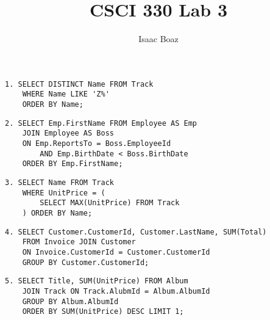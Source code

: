 \documentclass{article}
\title{CSCI 330 Lab 3}
\author{Isaac Boaz}
\begin{document}
\maketitle

\lstset{
    language=SQL,
    basicstyle=\small,
    showstringspaces=false
}

\begin{lstlisting}
1. SELECT DISTINCT Name FROM Track
    WHERE Name LIKE 'Z%'
    ORDER BY Name;\end{lstlisting}

\begin{lstlisting}
2. SELECT Emp.FirstName FROM Employee AS Emp
    JOIN Employee AS Boss
    ON Emp.ReportsTo = Boss.EmployeeId
        AND Emp.BirthDate < Boss.BirthDate
    ORDER BY Emp.FirstName;
\end{lstlisting}

\begin{lstlisting}
3. SELECT Name FROM Track
    WHERE UnitPrice = (
        SELECT MAX(UnitPrice) FROM Track
    ) ORDER BY Name;
\end{lstlisting}

\begin{lstlisting}
4. SELECT Customer.CustomerId, Customer.LastName, SUM(Total)
    FROM Invoice JOIN Customer
    ON Invoice.CustomerId = Customer.CustomerId
    GROUP BY Customer.CustomerId;
\end{lstlisting}

\begin{lstlisting}
5. SELECT Title, SUM(UnitPrice) FROM Album
    JOIN Track ON Track.AlubmId = Album.AlbumId
    GROUP BY Album.AlbumId
    ORDER BY SUM(UnitPrice) DESC LIMIT 1;
\end{lstlisting}
\end{document}
